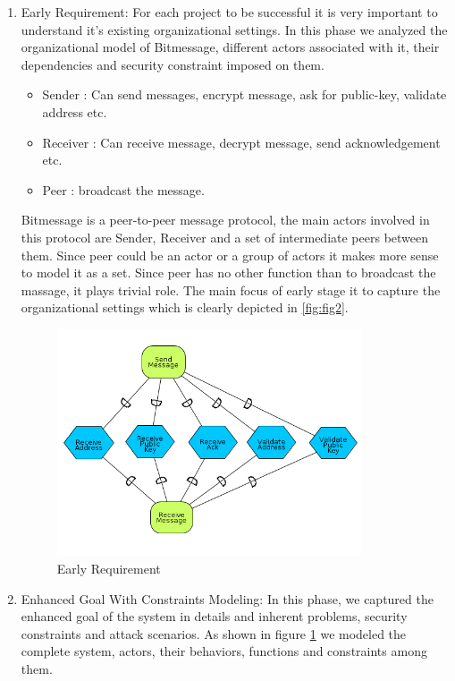 \documentclass{acm_proc_article-sp}
\begin{document}
\begin{enumerate}
\item Early Requirement: For each project to be successful it is very important to understand it's existing organizational settings. In this phase we analyzed the organizational model of Bitmessage, different actors associated with it, their dependencies and security constraint imposed on them.  

\begin{itemize}
\item Sender : Can send messages, encrypt message, ask for public-key, validate address etc.
\item Receiver : Can receive message, decrypt message, send acknowledgement etc.
\item Peer : broadcast the message.
\end{itemize}

Bitmessage is a peer-to-peer message protocol, the main actors involved in this protocol are Sender, Receiver and a set of intermediate peers between them. Since peer could be an actor or a group of actors it makes more sense to model it as a set. Since peer has no other function than to broadcast the massage, it plays trivial role. The main focus of early stage it to capture the organizational settings which is clearly depicted  in \ref{fig:fig2}.
 
\begin{figure}[ht!]\label{fig:fig2}
\centering
\includegraphics[width=90mm]{Early-Requirements.png}
\caption{Early Requirement}
\label{f1.1}
\end{figure}

\item Enhanced Goal With Constraints Modeling: In this phase, we captured the enhanced goal of the system in details and inherent problems, security constraints and attack scenarios. As shown in figure \ref{f1.1} we modeled the complete system, actors, their behaviors, functions and constraints among them. 


\end{enumerate}
\end{document}

